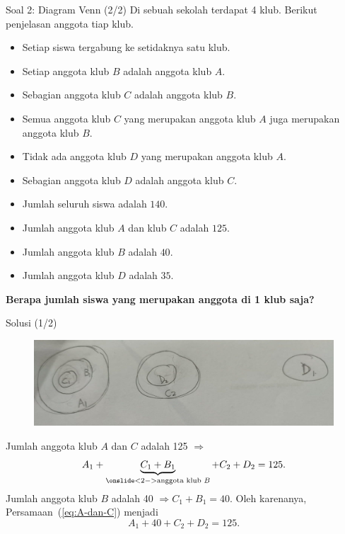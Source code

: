 \documentclass[english,t]{beamer}
\begin{document}
\begin{frame}{Soal 2: Diagram Venn (2/2)}   
Di sebuah sekolah terdapat 4 klub. Berikut penjelasan anggota tiap klub.
\begin{itemize}
	\item Setiap siswa tergabung ke setidaknya satu klub.
	\item Setiap anggota klub $B$ adalah anggota klub $A$.
	\item Sebagian anggota klub $C$ adalah anggota klub $B$.
	\item Semua anggota klub $C$ yang merupakan anggota klub $A$ juga merupakan anggota klub $B$.
	\item Tidak ada anggota klub $D$ yang merupakan anggota klub $A$.
	\item Sebagian anggota klub $D$ adalah anggota klub $C$.
	\item Jumlah seluruh siswa adalah $140$.
	\item Jumlah anggota klub $A$ dan klub $C$ adalah $125$.
	\item Jumlah anggota klub $B$ adalah $40$.
	\item Jumlah anggota klub $D$ adalah $35$.
\end{itemize}
 \textbf{Berapa jumlah siswa yang merupakan anggota di 1 klub saja?}
\end{frame}

\begin{frame}{Solusi (1/2)}
	\begin{figure}[!ht]
		\centering
		\includegraphics[scale=0.2]{images/solusi-soal-2}		
	\end{figure}
	Jumlah anggota klub $A$ dan $C$ adalah 125 $\Rightarrow$
	\begin{equation}
		A_1 + \underbrace{C_1 + B_1}_{\onslide<2->{\text{anggota klub }B}} + C_2 + D_2 = 125.
		\label{eq:A-dan-C}
	\end{equation}
	Jumlah anggota klub $B$ adalah 40 $\Rightarrow C_1 + B_1 = 40$. Oleh karenanya, Persamaan~(\ref{eq:A-dan-C}) menjadi 	
	\begin{equation}
		A_1 + 40 + C_2 + D_2 = 125.
		\label{eq:A-B-dan-C}
	\end{equation}
\end{frame}
\end{document}
